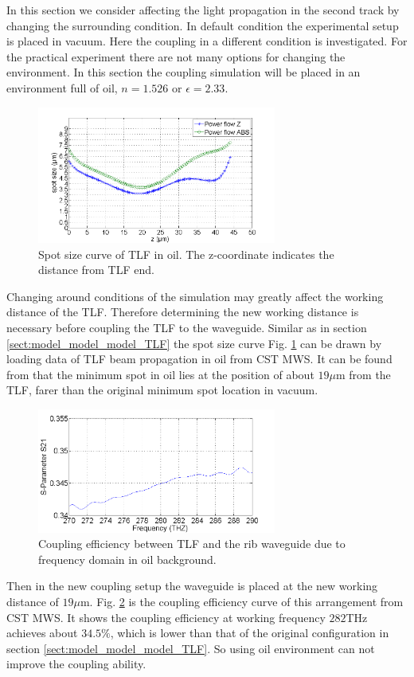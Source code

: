 In this section we consider affecting the light propagation in the second track by changing the surrounding condition. In default condition the experimental setup is placed in vacuum. Here the coupling in a different condition is investigated. For the practical experiment there are not many options for changing the environment. In this section the coupling simulation will be placed in an environment full of oil, $n=1.526$ or $\epsilon=2.33$. \\

\begin{figure}[!ht]
\centering
\includegraphics[width=0.7\textwidth]{bilder/spot_curve_oil}
\caption{Spot size curve of TLF in oil. The z-coordinate indicates the distance from TLF end.}
\label{fig:oil_spot_curve}
\end{figure}
Changing around conditions of the simulation may greatly affect the working distance of the TLF. Therefore determining the new working distance is necessary before coupling the TLF to the waveguide.  Similar as in section \ref{sect:model_model_model_TLF} the spot size curve Fig. \ref{fig:oil_spot_curve} can be drawn by loading data of TLF beam propagation in oil from CST MWS. It can be found from that the minimum spot in oil lies at the position of about $19\mu$m from the TLF, farer than the original minimum spot location in vacuum.\\    
\begin{figure}[!ht]
\centering
\includegraphics[width=0.7\textwidth]{bilder/s21_oil_curve}
\caption{Coupling efficiency between TLF and the rib waveguide due to frequency domain in oil background. }
\label{fig:oil_coupling_curve}
\end{figure}

Then in the new coupling setup the waveguide is placed at the new working distance of $19\mu$m. Fig. \ref{fig:oil_coupling_curve} is the coupling efficiency curve of this arrangement from CST MWS. It shows the coupling efficiency at working frequency $282$THz achieves about $34.5\%$, which is lower than that of the original configuration in section \ref{sect:model_model_model_TLF}. So using oil environment can not improve the coupling ability.\\

